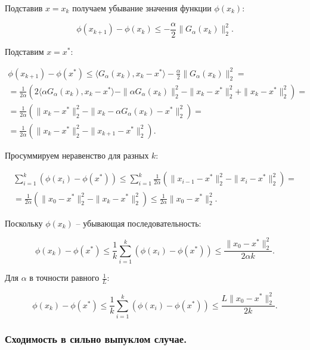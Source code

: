 Подставив $x=x_k$ получаем убывание значения функции $\phi(x_k)$:

\begin{equation}
    \phi(x_{k+1})-\phi(x_k)\leq-\frac\alpha2\|G_\alpha(x_k)\|_2^2.
\end{equation}

Подставим $x=x^*$:

\begin{equation}
\begin{aligned}
    \phi(x_{k+1})-\phi(x^*)\leq
    \langle G_\alpha(x_k),x_k-x^*\rangle-\frac\alpha2\|G_\alpha(x_k)\|_2^2=\\=
    \frac1{2\alpha}\left(2\langle\alpha G_\alpha(x_k),x_k-x^*\rangle-\|\alpha G_\alpha(x_k)\|_2^2-\|x_k-x^*\|_2^2+\|x_k-x^*\|_2^2\right)=\\=
    \frac1{2\alpha}\left(\|x_k-x^*\|_2^2-\|x_k-\alpha G_\alpha(x_k)-x^*\|_2^2\right)=\\=
    \frac1{2\alpha}\left(\|x_k-x^*\|_2^2-\|x_{k+1}-x^*\|_2^2\right).
\end{aligned}
\end{equation}

Просуммируем неравенство для разных $k$:

\begin{equation}
\begin{aligned}
    \sum\limits_{i=1}^k(\phi(x_i)-\phi(x^*))\leq
    \sum\limits_{i=1}^k\frac1{2\alpha}\left(\|x_{i-1}-x^*\|_2^2-\|x_i-x^*\|_2^2\right)=\\=
    \frac1{2\alpha}\left(\|x_0-x^*\|_2^2-\|x_k-x^*\|_2^2\right)\leq
    \frac1{2\alpha}\|x_0-x^*\|_2^2.
\end{aligned}
\end{equation}

Поскольку $\phi(x_k)$ -- убывающая последовательность:

\begin{equation}
    \phi(x_k)-\phi(x^*)\leq
    \frac1k\sum\limits_{i=1}^k(\phi(x_i)-\phi(x^*))\leq
    \frac{\|x_0-x^*\|_2^2}{2\alpha k}.
\end{equation}

Для $\alpha$ в точности равного $\frac1L$:

\begin{equation}
    \phi(x_k)-\phi(x^*)\leq
    \frac1k\sum\limits_{i=1}^k(\phi(x_i)-\phi(x^*))\leq
    \frac{L\|x_0-x^*\|_2^2}{2k}.
\end{equation}

\subsubsection*{Сходимость в сильно выпуклом случае.}

